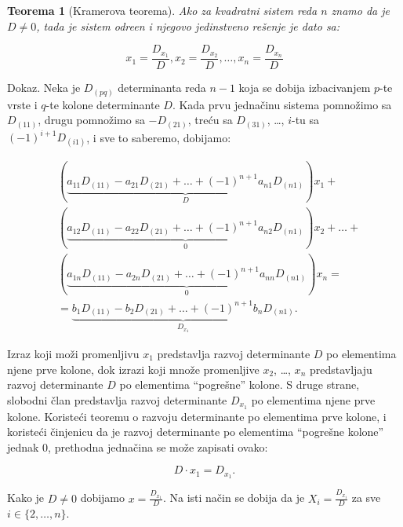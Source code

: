 \documentclass[11pt]{article}
\theoremstyle{masulthm}
\newtheorem{theorem}{Teorema}[section]
\theoremstyle{masuldef}
\theoremstyle{masulexmp}
\begin{document}
\begin{theorem}[Kramerova teorema]

Ako za kvadratni sistem reda $ n $ znamo da je $ D \ne 0 $,
tada je sistem odre\dj en i njegovo jedinstveno rešenje je dato sa:

\begin{equation*}
    x_1 = \frac{D_{x_1}}{D},
    x_2 = \frac{D_{x_2}}{D},
    \dots,
    x_n = \frac{D_{x_n}}{D}
\end{equation*}

\end{theorem}

\noindent
Dokaz.
  Neka je $ D_{(pq)} $ determinanta reda $ n - 1 $ koja se dobija izbacivanjem
  $ p $-te vrste i $ q $-te kolone determinante $ D $.
  Kada prvu jednačinu sistema pomnožimo sa $ D_{(11)} $, drugu pomnožimo sa
  $ -D_{(21)} $, treću sa $ D_{(31)} $, \dots, $ i $-tu sa
  $ (-1)^{i+1} D_{(i1)} $, i sve to saberemo, dobijamo:
  
  \begin{align*}
      & (\underbrace{a_{11} D_{(11)} - a_{21} D_{(21)} + \ldots + (-1)^{n+1} a_{n1} D_{(n1)}}_D) x_1 + \\
      & (\underbrace{a_{12} D_{(11)} - a_{22} D_{(21)} + \ldots + (-1)^{n+1} a_{n2} D_{(n1)}}_0) x_2 + \ldots + \\
      & (\underbrace{a_{1n} D_{(11)} - a_{2n} D_{(21)} + \ldots + (-1)^{n+1} a_{nn} D_{(n1)}}_0) x_n = \\
      & = \underbrace{b_1 D_{(11)} - b_2 D_{(21)} + \ldots + (-1)^{n+1} b_n D_{(n1)}}_{D_{x_1}} .
  \end{align*}
  
  \noindent
  Izraz koji moži promenljivu $ x_1 $ predstavlja razvoj determinante $ D $
  po elementima njene prve kolone, dok izrazi koji množe promenljive $ x_2 $, \dots, $ x_n $ predstavljaju razvoj determinante $ D $ po elementima ``pogrešne'' kolone.
  S druge strane, slobodni član predstavlja razvoj determinante $ D_{x_1} $ po elementima njene prve kolone.
  Koristeći teoremu o razvoju determinante po elementima prve kolone, i koristeći činjenicu da je
  razvoj determinante po elementima ``pogrešne kolone'' jednak 0, prethodna jednačina se može
  zapisati ovako:
  
  \begin{equation*}
      D \cdot x_1 = D_{x_1}.
  \end{equation*}
  
  \noindent
  Kako je $ D \ne 0 $ dobijamo $ x = \frac{D_{x_1}}{D} $. Na isti način se dobija da je
  $ X_i = \frac{D_{x_i}}{D} $ za sve $ i \in \{2, \dots, n\} $.
\end{document}
